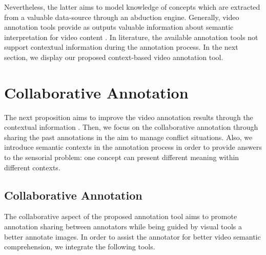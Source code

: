 

	Nevertheless, the latter aims to model knowledge of concepts which are extracted from a 
	valuable data-source through an abduction engine. Generally, video annotation tools provide
	as outputs valuable information about semantic interpretation for video content 
	\citep{Dasiopoulou2011}. In literature, the available annotation tools  not support
	contextual information during the annotation process. In the next section, we display our
	proposed context-based video annotation tool.




	\section{Collaborative Annotation}
	\label{c1_3}

	The next proposition aims to improve the video annotation results through the 
	contextual information \citep{Ksentini2012}. Then, we focus on the collaborative
	annotation through sharing the past annotations in the aim to manage conflict situations.
	Also, we introduce semantic contexts in the annotation process in order to provide answers
	to the sensorial problem: one concept can present different meaning within different contexts.
	
	\subsection{Collaborative Annotation}
		
	The collaborative aspect of the proposed annotation tool aims to promote annotation
	sharing between annotators while being guided by visual tools a better annotate images.
	In order to assist the annotator for better video semantic comprehension, we integrate the following tools.


